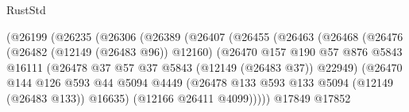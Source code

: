 \begin{lexlean}{RustStd}
\begin{coremodule}
                                      (@26199
                                        (@26235
                                          (@26306
                                            (@26389
                                              (@26407
                                                (@26455
                                                  (@26463
                                                    (@26468
                                                      (@26476
                                                        (@26482 (@12149 (@26483 @96)) @12160)
                                                        (@26470
                                                          @157
                                                          @190
                                                          @57
                                                          @876
                                                          @5843
                                                          @16111
                                                          (@26478
                                                            @37
                                                            @57
                                                            @37
                                                            @5843
                                                            (@12149 (@26483 @37))
                                                            @22949)
                                                          (@26470
                                                            @144
                                                            @126
                                                            @593
                                                            @44
                                                            @5094
                                                            @4449
                                                            (@26478
                                                              @133
                                                              @593
                                                              @133
                                                              @5094
                                                              (@12149 (@26483 @133))
                                                              @16635)
                                                            (@12166 @26411 @4099)))))
                                                    @17849
                                                    @17852

\end{coremodule}
\end{lexlean}
